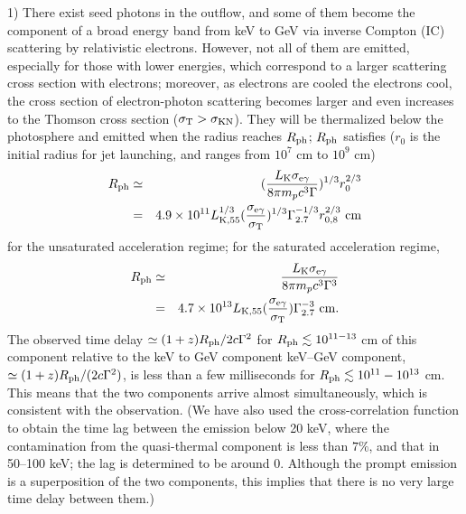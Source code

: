 \documentclass[prd,twocolumn,amsmath,amssymb,aps,linenumbers]{revtex4-2} %
\providecommand{\DIFaddtex}[1]{{\protect\color{blue} \sf #1}} %
\providecommand{\DIFdeltex}[1]{{\protect\color{red} \scriptsize #1}} %
\providecommand{\DIFaddbegin}{} %
\providecommand{\DIFaddend}{} %
\providecommand{\DIFdelbegin}{} %
\providecommand{\DIFdelend}{} %
\providecommand{\DIFadd}[1]{\texorpdfstring{\DIFaddtex{#1}}{#1}} %
\providecommand{\DIFdel}[1]{\texorpdfstring{\DIFdeltex{#1}}{}} %
\newcommand{\DIFscaledelfig}{0.5}
\newlength{\DIFdelgraphicswidth} %
\newlength{\DIFdelgraphicsheight} %
\newcommand{\DIFaddincludegraphics}[2][]{{\color{blue}\fbox{\DIFOincludegraphics[#1]{#2}}}} %
\newcommand{\DIFdelincludegraphics}[2][]{%
\sbox{\DIFdelgraphicsbox}{\DIFOincludegraphics[#1]{#2}}%
\settoboxwidth{\DIFdelgraphicswidth}{\DIFdelgraphicsbox} %
\settoboxtotalheight{\DIFdelgraphicsheight}{\DIFdelgraphicsbox} %
\scalebox{\DIFscaledelfig}{%
\parbox[b]{\DIFdelgraphicswidth}{\usebox{\DIFdelgraphicsbox}\\[-\baselineskip] \rule{\DIFdelgraphicswidth}{0em}}\llap{\resizebox{\DIFdelgraphicswidth}{\DIFdelgraphicsheight}{%
\setlength{\unitlength}{\DIFdelgraphicswidth}%
\begin{picture}(1,1)%
\thicklines\linethickness{2pt} %
{\color[rgb]{1,0,0}\put(0,0){\framebox(1,1){}}}%
{\color[rgb]{1,0,0}\put(0,0){\line( 1,1){1}}}%
{\color[rgb]{1,0,0}\put(0,1){\line(1,-1){1}}}%
\end{picture}%
}\hspace*{3pt}}} %
} %
\DeclareRobustCommand{\DIFaddbegin}{\DIFOaddbegin \let\includegraphics\DIFaddincludegraphics} %
\DeclareRobustCommand{\DIFaddend}{\DIFOaddend \let\includegraphics\DIFOincludegraphics} %
\DeclareRobustCommand{\DIFdelbegin}{\DIFOdelbegin \let\includegraphics\DIFdelincludegraphics} %
\DeclareRobustCommand{\DIFdelend}{\DIFOaddend \let\includegraphics\DIFOincludegraphics} %
\begin{document}
1) There exist seed photons in the outflow, and some of them become the component of a broad energy band from keV to GeV via inverse Compton (IC) scattering by relativistic electrons. However, not all \DIFaddbegin \DIFadd{of them }\DIFaddend are emitted, especially \DIFdelbegin \DIFdel{for }\DIFdelend those with lower energies, which correspond to a larger scattering cross section with electrons; moreover, as \DIFdelbegin \DIFdel{electrons are cooled}\DIFdelend \DIFaddbegin \DIFadd{the electrons cool}\DIFaddend , the cross section of electron-photon scattering becomes larger and even increases to the Thomson cross section ($\sigma_{\rm T}>\sigma_{\rm KN}$). They will be thermalized below the photosphere and emitted when the radius reaches $R_{\rm ph}$; $R_{\rm ph}$ satisfies ($r_0$ is the initial radius for jet launching, and ranges from $10^7$ cm to $10^9$ cm)~\citep{2018pgrb.book.....Z}
\begin{eqnarray}
    R_{\rm ph}&\simeq&(\frac{L_{\rm K}\sigma_{\rm e\gamma}}{8\pi m_pc^3\Gamma})^{1/3} r_0^{2/3}\nonumber\\
    &=&4.9\times10^{11}L_{\rm K,55} ^{1/3} (\frac{\sigma_{\rm e\gamma}}{\sigma_{\rm T}})^{1/3}\Gamma_{2.7}^{-1/3}r^{2/3}_{0,8}\ \rm cm %
 \end{eqnarray}
 for the unsaturated acceleration regime; for the saturated acceleration regime,
 \begin{eqnarray}
 R_{\rm ph}&\simeq&\frac{L_{\rm K}\sigma_{\rm e\gamma}}{8\pi m_pc^3\Gamma^3}\nonumber\\
    &=& 4.7\times10^{13}L_{\rm K, 55} (\frac{\sigma_{\rm e\gamma}}{\sigma_{\rm T}}) \Gamma_{2.7}^{-3}\ \rm cm.
\end{eqnarray}
The observed time delay \DIFdelbegin \DIFdel{$\simeq(1+z)R_{\rm ph}/2c\Gamma^2$ for $R_{\rm ph}\lesssim10^{11-13}$ cm }\DIFdelend \DIFaddbegin \DIFadd{of this component }\DIFaddend relative to the \DIFdelbegin \DIFdel{keV to GeV component}\DIFdelend \DIFaddbegin \DIFadd{keV--GeV component, $\simeq(1+z)R_{\rm ph}/(2c\Gamma^2)$, }\DIFaddend is less than a few milliseconds \DIFaddbegin \DIFadd{for $R_{\rm ph}\lesssim10^{11}-10^{13}$ cm}\DIFaddend . This means that \DIFaddbegin \DIFadd{the }\DIFaddend two components arrive almost simultaneously, which is consistent with the observation. \DIFaddbegin \DIFadd{(We have also used the cross-correlation function to obtain the time lag between the emission below 20 keV, where the contamination from the quasi-thermal component is less than $7\%$, and that in 50--100 keV; the lag is determined to be around 0. Although the prompt emission is a superposition of the two components, this implies that there is no very large time delay between them.)
}\DIFaddend 
\end{document}
